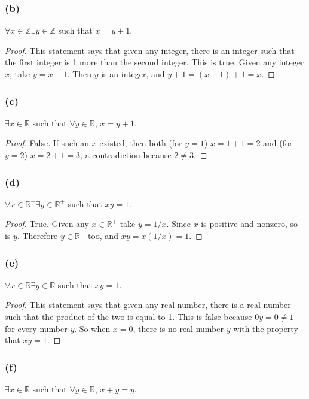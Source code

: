 \documentclass[14pt]{extarticle}
\newcommand{\R}{\mathbb{R}}
\newcommand{\Z}{\mathbb{Z}}
\newcommand{\fa}{\forall}
\newcommand{\te}{\exists}
\begin{document}
\subsubsection{(b)}
$\fa x \in \Z \te y \in \Z$ such that $x = y + 1$.

\begin{proof}
    This statement says that given any integer, there is an integer such that the first integer is 1 more than the second integer. This is true. Given any integer $x$, take $y = x - 1$. Then $y$ is an integer, and $y + 1 = (x - 1) + 1 = x$.
\end{proof}

\subsubsection{(c)}
$\te x \in \R$ such that $\fa y \in \R$, $x = y + 1$.

\begin{proof}
    False. If such an $x$ existed, then both (for $y = 1$) $x = 1 + 1 = 2$ and (for $y = 2$) $x = 2 + 1 = 3$, a contradiction because $2 \neq 3$.
\end{proof}

\subsubsection{(d)}
$\fa x \in \R^+ \te y \in \R^+$ such that $xy = 1$.

\begin{proof}
    True. Given any $x \in \R^+$ take $y = 1/x$. Since $x$ is positive and nonzero, so is $y$. Therefore $y \in \R^+$ too, and $xy = x(1/x) = 1$.
\end{proof}

\subsubsection{(e)}
$\fa x \in \R \te y \in \R$ such that $xy = 1$.

\begin{proof}
    This statement says that given any real number, there is a real number such that the product of the two is equal to 1. This is false because $0y = 0 \neq 1$ for every number $y$. So when $x = 0$, there is no real number $y$ with the property that $xy = 1$.
\end{proof}

\subsubsection{(f)}
$\te x \in \R$ such that $\fa y \in \R$, $x + y = y$.
\end{document}

